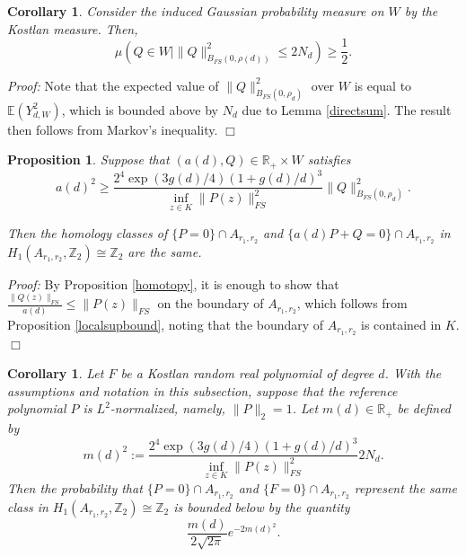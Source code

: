 \documentclass [11pt]{amsart}
\newtheorem {proposition}[theorem]{Proposition}
\newtheorem {corollary}[theorem]{Corollary}
\theoremstyle{remark}
\numberwithin{equation}{section}
\numberwithin{theorem}{section}
\begin{document}
\begin{corollary} \label{onehalf}
Consider the induced Gaussian probability measure on $W$ by the Kostlan measure. Then,
\[  \mathbb{\mu}(Q\in W | \|Q\|^2_{B_{FS}(0,\rho(d))}\leq 2N_{d})\geq \frac{1}{2}. \]
\end{corollary} 

\noindent \textit{Proof:} Note that the expected value of $\|Q\|^2_{B_{FS}(0,\rho_{d})}$ over $W$ is equal to $\mathbb{E}(Y_{d,W}^2)$, which is bounded above by $N_{d}$ due to Lemma \ref{directsum}. The result then follows from Markov's inequality. \hfill $\Box$ 

\begin{proposition} \label{aboundprop}
Suppose that $(a(d),Q)\in \mathbb{R_{+}}\times W$ satisfies 
\begin{equation} \label{abound}
a(d)^2\geq \frac{2^4  \exp\left(3g(d)/4\right) \left(1+g(d)/d\right)^3 }{\inf_{z\in K}  \|P(z)\|^2_{FS} }  \|Q\|^2_{B_{FS}(0,\rho_{d})}.  
\end{equation}

\noindent Then the homology classes of $\{P=0\}\cap A_{r_{1},r_{2}}$ and $\{a(d)P+Q=0\}\cap A_{r_{1},r_{2}}$ in $H_{1}(A_{r_{1}, r_{2}}, \mathbb{Z}_{2})\cong \mathbb{Z}_{2}$ are the same.
\end{proposition} 

\noindent\textit{Proof:} By Proposition \ref{homotopy}, it is enough to show that $\displaystyle{ \frac{\|Q(z)\|_{FS}}{a(d)}\leq \|P(z)\|_{FS}}$ on the boundary of $A_{r_{1},r_{2}}$, which follows from Proposition \ref{localsupbound}, noting that the boundary of $A_{r_{1},r_{2}}$ is contained in $K$. \hfill $\Box$  

\begin{corollary} \label{lowerprob}
Let $F$ be a Kostlan random real polynomial of degree $d$. With the assumptions and notation in this subsection, suppose that the reference polynomial $P$ is $L^2$-normalized, namely, $\|P\|_{2}=1$.  Let  $m(d)\in \mathbb{R}_{+}$ be defined by
\begin{equation} \label{md}
m(d)^2:= \frac{2^4  \exp\left(3g(d)/4\right) \left(1+g(d)/d\right)^3 }{\inf_{z\in K}  \|P(z)\|^2_{FS} }2N_{d}.
\end{equation}
 Then the probability that $\{P=0\}\cap A_{r_{1},r_{2}}$ and $\{F=0\}\cap A_{r_{1},r_{2}}$ represent the same class in $H_{1}(A_{r_{1}, r_{2}}, \mathbb{Z}_{2})\cong \mathbb{Z}_{2}$ is bounded below by the quantity
\[ \frac{m(d)}{2\sqrt{2\pi}} e^{-2m(d)^2}. \] 
\end{corollary} 
\end{document}

